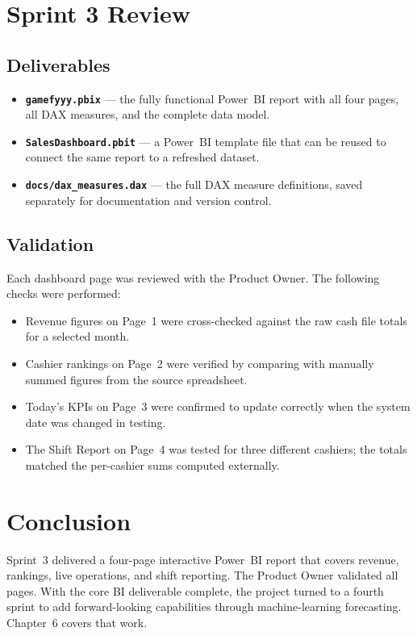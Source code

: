 \section{Sprint 3 Review}

\subsection{Deliverables}

\begin{itemize}
  \item \textbf{\texttt{gamefyyy.pbix}} — the fully functional Power~BI report with
        all four pages, all DAX measures, and the complete data model.
  \item \textbf{\texttt{SalesDashboard.pbit}} — a Power~BI template file that can
        be reused to connect the same report to a refreshed dataset.
  \item \textbf{\texttt{docs/dax\_measures.dax}} — the full DAX measure definitions,
        saved separately for documentation and version control.
\end{itemize}

\subsection{Validation}

Each dashboard page was reviewed with the Product Owner. The following checks were
performed:

\begin{itemize}[noitemsep]
  \item Revenue figures on Page~1 were cross-checked against the raw cash file
        totals for a selected month.
  \item Cashier rankings on Page~2 were verified by comparing with manually
        summed figures from the source spreadsheet.
  \item Today's KPIs on Page~3 were confirmed to update correctly when the
        system date was changed in testing.
  \item The Shift Report on Page~4 was tested for three different cashiers; the
        totals matched the per-cashier sums computed externally.
\end{itemize}

\section{Conclusion}

Sprint~3 delivered a four-page interactive Power~BI report that covers revenue,
rankings, live operations, and shift reporting. The Product Owner validated all
pages. With the core BI deliverable complete, the project turned to a fourth sprint
to add forward-looking capabilities through machine-learning forecasting. Chapter~6
covers that work.

